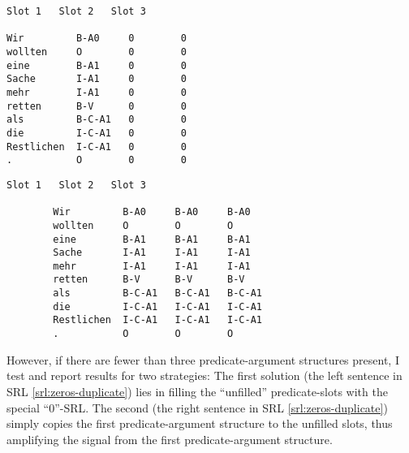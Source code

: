 \begingroup
\begin{srl}[!h]
  \begin{minipage}{0.45\linewidth}
  \vspace{0pt}
    \begin{BVerbatim}[commandchars=\\\{\}, fontsize=\footnotesize]
            Slot 1   Slot 2   Slot 3

Wir         B-A0     0        0
wollten     O        0        0
eine        B-A1     0        0
Sache       I-A1     0        0
mehr        I-A1     0        0
retten      B-V      0        0
als         B-C-A1   0        0
die         I-C-A1   0        0
Restlichen  I-C-A1   0        0
.           O        0        0
      \end{BVerbatim}
  \end{minipage}
  \begin{minipage}{0.45\linewidth}
  \vspace{0pt}
    \begin{BVerbatim}[commandchars=\\\{\}, fontsize=\footnotesize]
                    Slot 1   Slot 2   Slot 3

        Wir         B-A0     B-A0     B-A0
        wollten     O        O        O
        eine        B-A1     B-A1     B-A1
        Sache       I-A1     I-A1     I-A1
        mehr        I-A1     I-A1     I-A1
        retten      B-V      B-V      B-V
        als         B-C-A1   B-C-A1   B-C-A1
        die         I-C-A1   I-C-A1   I-C-A1
        Restlichen  I-C-A1   I-C-A1   I-C-A1
        .           O        O        O
    \end{BVerbatim}
  \end{minipage}
\end{srl}
\label{srl:zeros-duplicate}
\endgroup


However, if there are fewer than three predicate-argument structures
present, I test and report results for two strategies: The first solution (the left sentence
in SRL \ref{srl:zeros-duplicate}) lies in filling the ``unfilled'' predicate-slots with the
special ``0''-SRL. The second (the right sentence in SRL \ref{srl:zeros-duplicate}) simply
copies the first predicate-argument structure to the unfilled slots, thus amplifying the signal
from the first predicate-argument structure.



